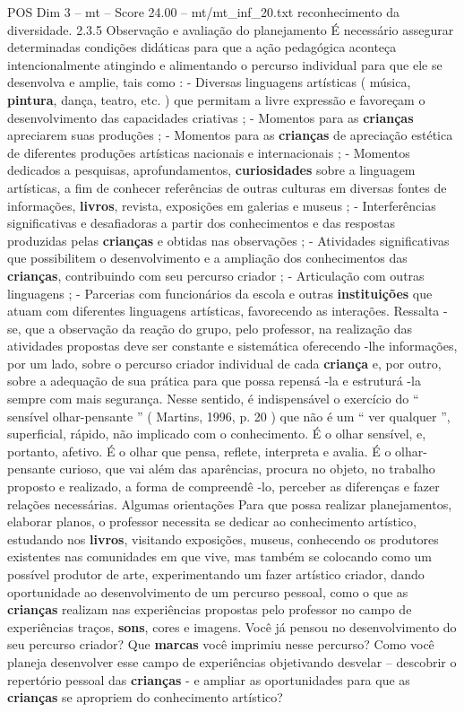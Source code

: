 \begin{textsample}{POS Dim 3 – mt – Score 24.00 – mt/mt\_inf\_20.txt}
reconhecimento da diversidade. 2.3.5 Observação e avaliação do planejamento É necessário assegurar determinadas condições didáticas para que a ação pedagógica aconteça intencionalmente atingindo e alimentando o percurso individual para que ele se desenvolva e amplie, tais como : - Diversas linguagens artísticas ( música, \textbf{pintura}, dança, teatro, etc. ) que permitam a livre expressão e favoreçam o desenvolvimento das capacidades criativas ; - Momentos para as \textbf{crianças} apreciarem suas produções ; - Momentos para as \textbf{crianças} de apreciação estética de diferentes produções artísticas nacionais e internacionais ; - Momentos dedicados a pesquisas, aprofundamentos, \textbf{curiosidades} sobre a linguagem artísticas, a fim de conhecer referências de outras culturas em diversas fontes de informações, \textbf{livros}, revista, exposições em galerias e museus ; - Interferências significativas e desafiadoras a partir dos conhecimentos e das respostas produzidas pelas \textbf{crianças} e obtidas nas observações ; - Atividades significativas que possibilitem o desenvolvimento e a ampliação dos conhecimentos das \textbf{crianças}, contribuindo com seu percurso criador ; - Articulação com outras linguagens ; - Parcerias com funcionários da escola e outras \textbf{instituições} que atuam com diferentes linguagens artísticas, favorecendo as interações.
Ressalta -se, que a observação da reação do grupo, pelo professor, na realização das atividades propostas deve ser constante e sistemática oferecendo -lhe informações, por um lado, sobre o percurso criador individual de cada \textbf{criança} e, por outro, sobre a adequação de sua prática para que possa repensá -la e estruturá -la sempre com mais segurança.
Nesse sentido, é indispensável o exercício do “ sensível olhar-pensante ” ( Martins, 1996, p. 20 ) que não é um “ ver qualquer ”, superficial, rápido, não implicado com o conhecimento.
É o olhar sensível, e, portanto, afetivo.
É o olhar que pensa, reflete, interpreta e avalia.
É o olhar-pensante curioso, que vai além das aparências, procura no objeto, no trabalho proposto e realizado, a forma de compreendê -lo, perceber as diferenças e fazer relações necessárias.
Algumas orientações Para que possa realizar planejamentos, elaborar planos, o professor necessita se dedicar ao conhecimento artístico, estudando nos \textbf{livros}, visitando exposições, museus, conhecendo os produtores existentes nas comunidades em que vive, mas também se colocando como um possível produtor de arte, experimentando um fazer artístico criador, dando oportunidade ao desenvolvimento de um percurso pessoal, como o que as \textbf{crianças} realizam nas experiências propostas pelo professor no campo de experiências traços, \textbf{sons}, cores e imagens.
Você já pensou no desenvolvimento do seu percurso criador?
Que \textbf{marcas} você imprimiu nesse percurso?
Como você planeja desenvolver esse campo de experiências objetivando desvelar – descobrir o repertório pessoal das \textbf{crianças} - e ampliar as oportunidades para que as \textbf{crianças} se apropriem do conhecimento artístico?


\end{textsample}
